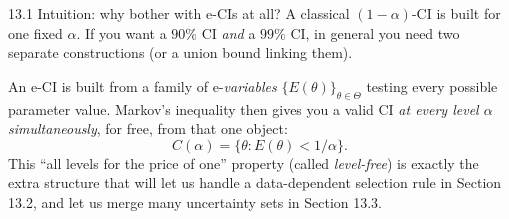 \documentclass[aspectratio=169,10pt]{beamer}
\newcommand{\Theset}{\Theta}
\begin{document}
\begin{frame}{13.1 Intuition: why bother with e-CIs at all?}
  A classical $(1-\alpha)$-CI is built for one fixed $\alpha$. If you want a $90\%$ CI \emph{and} a $99\%$ CI, in general you need two separate constructions (or a union bound linking them).

  \vspace{0.3cm}
  An e-CI is built from a family of e-\emph{variables} $\{E(\theta)\}_{\theta \in \Theset}$ testing every possible parameter value. Markov's inequality then gives you a valid CI \emph{at every level $\alpha$ simultaneously}, for free, from that one object:
  \[
    C(\alpha) = \{\theta : E(\theta) < 1/\alpha\}.
  \]
  This ``all levels for the price of one'' property (called \emph{level-free}) is exactly the extra structure that will let us handle a data-dependent selection rule in Section 13.2, and let us merge many uncertainty sets in Section 13.3.
\end{frame}
\end{document}

